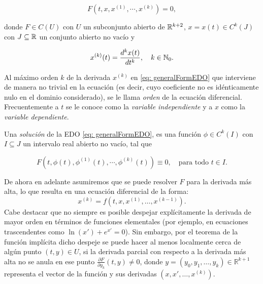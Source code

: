 \begin{equation}
	F(t, x, x^{(1)}, \cdots, x^{(k)}) = 0,
	\label{eq: generalFormEDO}
\end{equation}

\noindent donde $F \in C(U)$ con $U$ un subconjunto abierto de ${\mathbb{R}}^{k+2}$, $x = x(t) \in C^k(J)$ con $J \subseteq {\mathbb{R}}$ un conjunto abierto no vacío y

\begin{equation*}
	x^{(k)}(t) = \dfrac{d^{k}x(t)}{dt^{k}}, \quad k \in {\mathbb{N}}_0.
\end{equation*}

\noindent Al máximo orden $k$ de la derivada $x^{(k)}$ en \eqref{eq: generalFormEDO} que interviene de manera no trivial en la ecuación (es decir, cuyo coeficiente no es idénticamente nulo en el dominio considerado), se le llama \textit{orden} de la ecuación diferencial. Frecuentemente a $t$ se le conoce como la \textit{variable independiente} y a $x$ como la \textit{variable dependiente}.

Una \textit{solución} de la EDO \eqref{eq: generalFormEDO}, es una función $\phi \in C^{k}(I)$ con $I \subseteq J$ un intervalo real abierto no vacío, tal que

\begin{equation*}
	F(t, \phi(t), \phi^{(1)}(t), \cdots, \phi^{(k)}(t)) \equiv 0, \quad \text{para todo } t \in I.
\end{equation*}

De ahora en adelante asumiremos que se puede resolver $F$ para la derivada más alta, lo que resulta en una ecuación diferencial de la forma:
\begin{equation*}
	x^{(k)} = f(t, x, x^{(1)}, \ldots, x^{(k-1)}).
\end{equation*}
\noindent Cabe destacar que no siempre es posible despejar explícitamente la derivada de mayor orden en términos de funciones elementales (por ejemplo, en ecuaciones trascendentes como $\ln(x') + e^{x'} = 0$). Sin embargo, por el teorema de la función implícita dicho despeje se puede hacer al menos localmente cerca de algún punto $(t,y)\in U$, si la derivada parcial con respecto a la derivada más alta no se anula en ese punto $\frac{\partial F}{\partial y_{k}} (t,y) \neq 0$, donde $y = (y_0, y_1, \dots, y_k) \in \mathbb{R}^{k+1}$ representa el vector de la función y sus derivadas $(x, x', \dots, x^{(k)})$.

